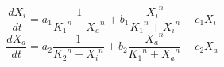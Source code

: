 \documentclass[preview]{standalone}
\begin{document}
$$\frac{dX_i}{dt} = a_1 \frac{1}{{K_1}^n+{X_a}^n} + b_1 \frac{{X_i}^n}{{K_1}^n+{X_i}^n} - c_1 X_i $$
$$\frac{dX_a}{dt} = a_2 \frac{1}{{K_2}^n+{X_i}^n} + b_2 \frac{{X_a}^n}{{K_1}^n+{X_a}^n} - c_2 X_a $$
\end{document}
